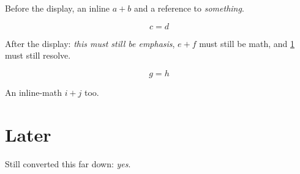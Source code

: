 \documentclass{article}
\begin{document}
Before the display, an inline $a+b$ and a reference to \emph{something}.

$$
c = d
$$

After the display: \emph{this must still be emphasis}, $e+f$ must still be
math, and \ref{sec:later} must still resolve.

\[ g = h \]

An inline-math \( i + j \) too.

\section{Later}\label{sec:later}

Still converted this far down: \emph{yes}.
\end{document}
